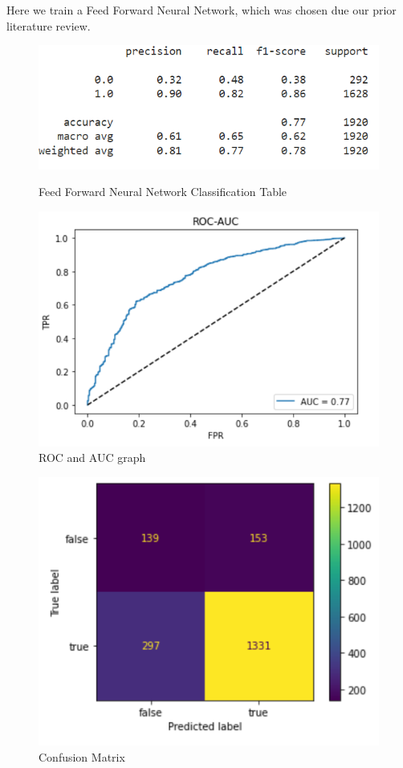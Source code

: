 \documentclass[12pt]{article}
\begin{document}
\noindent Here we train a Feed Forward Neural Network, which was chosen due our prior literature review.
\begin{figure}[H]
    \centering
    \begin{minipage}[b]{0.525\textwidth}
        \includegraphics[scale = .45]{figures/FFNNTable.png}
        \caption{Feed Forward Neural Network Classification Table}
    \end{minipage}
    \hfill
    \begin{minipage}[b]{0.4\textwidth}
        \includegraphics[scale = .30]{figures/FFNN_roc.png}
        \caption{ROC and AUC graph}
    \end{minipage}
\end{figure}


\begin{figure}
    \centering
    \includegraphics[scale = .30]{figures/FFNNconf.png} 
    \caption{Confusion Matrix}
\end{figure}
\end{document}
